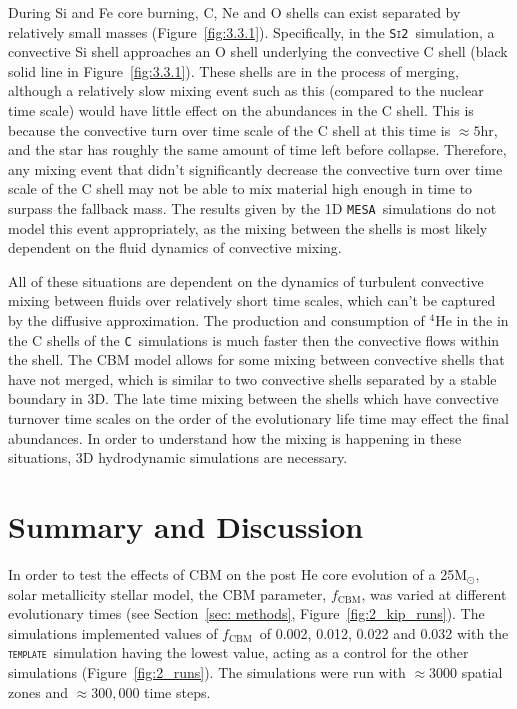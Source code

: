 \documentclass[useAMS,usenatbib]{mn2e}
\newcommand{\Msun}{\ensuremath{\mathrm{M}_\odot}}
\newcommand{\fcbm}{\ensuremath{f_\mathrm{CBM}}}
\newcommand{\mesa}{\texttt{MESA}}
\newcommand{\template}{\textsc{\texttt{template}}}
\newcommand{\Sib}{\textsc{\texttt{Si2}}}
\newcommand{\C}{\textsc{\texttt{C}}}
\newcommand{\nuclei}[2]{\ensuremath{\mathrm{^{#1}#2}}}
\newcommand{\helium}[1][4]{\nuclei{#1}{He}}
\begin{document}
During Si and Fe core burning, C, Ne and O shells can exist separated by 
relatively small masses (Figure~\ref{fig:3.3.1}). Specifically, in the \Sib\ 
simulation, a convective Si shell approaches an O shell underlying the 
convective C shell (black solid line in Figure~\ref{fig:3.3.1}). These shells 
are in the process of merging, although a relatively slow mixing event such 
as this (compared to the nuclear time scale) would have little effect on the 
abundances in the C shell. This is because the convective turn over time 
scale of the C shell at this time is $\approx 5 \mathrm{hr}$, and the star 
has roughly the same amount of time left before collapse. Therefore, any 
mixing event that didn't significantly decrease the convective turn over 
time scale of the C shell may not be able to mix material high enough
in time to surpass the fallback mass. The results given by the 1D 
\mesa~simulations do not model this event appropriately, as the mixing 
between the shells is most likely dependent on the fluid dynamics of 
convective mixing.

All of these situations are dependent on the dynamics of turbulent convective mixing between fluids over relatively short time scales, which can't be captured by the diffusive approximation. The production and consumption of $\helium$ in the in the C shells of the \C\ simulations is much faster then the convective flows within the shell. The CBM model allows for some mixing between convective shells that have not merged, which is similar to two convective shells separated by a stable boundary in 3D. The late time mixing between the shells which have convective turnover time scales on the order of the evolutionary life time may effect the final abundances. In order to understand how the mixing is happening in these situations, 3D hydrodynamic simulations are necessary. 

\section{Summary and Discussion} \label{sec: summary}


In order to test the effects of CBM on the post He core evolution of a 25\Msun,
solar metallicity stellar model, the CBM parameter, \fcbm, was varied at
different evolutionary times (see Section~\ref{sec: methods}, 
Figure~\ref{fig:2_kip_runs}). The simulations implemented values of \fcbm~of
0.002, 0.012, 0.022 and 0.032 with the \template\ simulation having the lowest
value, acting as a control for the other simulations (Figure~\ref{fig:2_runs}).
The simulations were run with $\approx 3000$ spatial zones and $\approx
300,000$ time steps.
\end{document}
